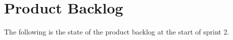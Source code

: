 \section{Product Backlog}\label{sec:spr2_prodback}
The following is the state of the product backlog at the start of sprint 2.



